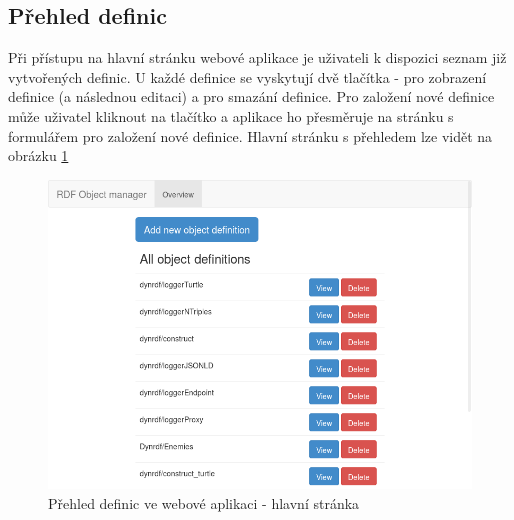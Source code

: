\documentclass[thesis=B,czech]{FITthesis}[2012/06/26]
\begin{document}
  \subsection{Přehled definic}
  Při přístupu na hlavní stránku webové aplikace je uživateli k dispozici seznam již vytvořených definic. U každé definice se vyskytují dvě tlačítka - pro 
  zobrazení definice (a následnou editaci) a pro smazání definice.
  Pro založení nové definice může uživatel kliknout na tlačítko  a aplikace ho přesměruje na stránku s formulářem pro založení nové definice.
  Hlavní stránku s přehledem lze vidět na obrázku \ref{web_overview}
  \begin{figure}\centering
 	\includegraphics[width=\textwidth]{web_overview}
 	\caption[Přehled definic ve webové aplikaci - hlavní stránka]{Přehled definic ve webové aplikaci - hlavní stránka}\label{web_overview}		
  \end{figure}
    
\end{document}
